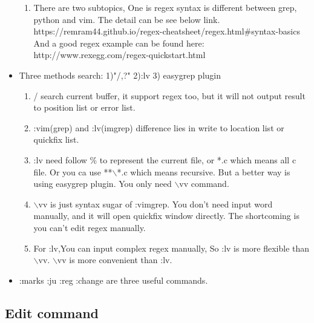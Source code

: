 \documentclass[a4paper,12pt,twoside]{book}
\begin{document}
\begin{itemize}
\begin{enumerate}
				\item There are two subtopics, One is regex syntax is different between grep, python and vim. The detail can be see below link.  https://remram44.github.io/regex-cheatsheet/regex.html\#syntax-basics And a good regex example can be found here:  http://www.rexegg.com/regex-quickstart.html
		\end{enumerate}

\item Three methods search: 1)"/,?" 2):lv 3) easygrep plugin
		\begin{enumerate}
						\item / search current buffer, it support regex too, but it will not output result to position list or error list. 

						\item :vim(grep) and :lv(imgrep) difference lies in write to location list or quickfix list.

						\item :lv need follow \% to represent the current file, or *.c which means all c file. Or you ca use **$\backslash$*.c which means recursive. But a better way is using easygrep plugin. You only need $\backslash$vv command.
										
						\item $\backslash$vv is just syntax sugar of :vimgrep. You don't need input word manually, and it will open quickfix window directly. The shortcoming is you can't edit regex manually. 

								
						\item For :lv,You can input complex regex manually, So :lv is more flexible than $\backslash$vv. $\backslash$vv is more convenient than :lv. 
						\end{enumerate}

		\item :marks :ju :reg :change are three useful commands. 		
\end{itemize}

\subsection{Edit command}
\end{document}
